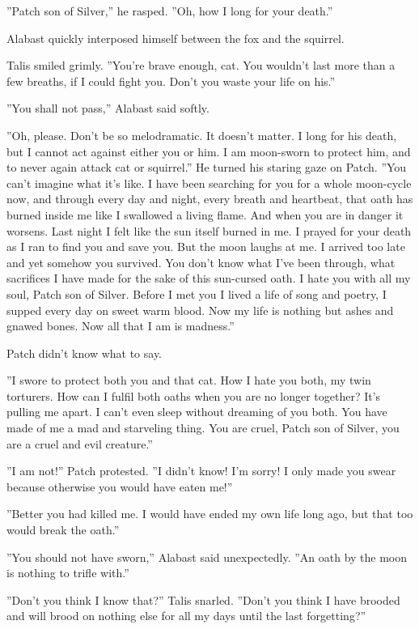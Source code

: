 \documentclass[11pt]{article}
\begin{document}
 ''Patch son of Silver,'' he rasped. ''Oh, how I long for your death.''\par
 Alabast quickly interposed himself between the fox and the squirrel.\par
 Talis smiled grimly. ''You're brave enough, cat. You wouldn't last more than a few breaths, if I could fight you. Don't you waste your life on his.''\par
 ''You shall not pass,'' Alabast said softly.\par
 ''Oh, please. Don't be so melodramatic. It doesn't matter. I long for his death, but I cannot act against either you or him. I am moon-sworn to protect him, and to never again attack cat or squirrel.'' He turned his staring gaze on Patch. ''You can't imagine what it's like. I have been searching for you for a whole moon-cycle now, and through every day and night, every breath and heartbeat, that oath has burned inside me like I swallowed a living flame. And when you are in danger it worsens. Last night I felt like the sun itself burned in me. I prayed for your death as I ran to find you and save you. But the moon laughs at me. I arrived too late and yet somehow you survived. You don't know what I've been through, what sacrifices I have made for the sake of this sun-cursed oath. I hate you with all my soul, Patch son of Silver. Before I met you I lived a life of song and poetry, I supped every day on sweet warm blood. Now my life is nothing but ashes and gnawed bones. Now all that I am is madness.''\par
 Patch didn't know what to say.\par
 ''I swore to protect both you and that cat. How I hate you both, my twin torturers. How can I fulfil both oaths when you are no longer together? It's pulling me apart. I can't even sleep without dreaming of you both. You have made of me a mad and starveling thing. You are cruel, Patch son of Silver, you are a cruel and evil creature.''\par
 ''I am not!'' Patch protested. ''I didn't know! I'm sorry! I only made you swear because otherwise you would have eaten me!''\par
 ''Better you had killed me. I would have ended my own life long ago, but that too would break the oath.''\par
 ''You should not have sworn,'' Alabast said unexpectedly. ''An oath by the moon is nothing to trifle with.''\par
 ''Don't you think I know that?'' Talis snarled. ''Don't you think I have brooded and will brood on nothing else for all my days until the last forgetting?''\par
\end{document}
